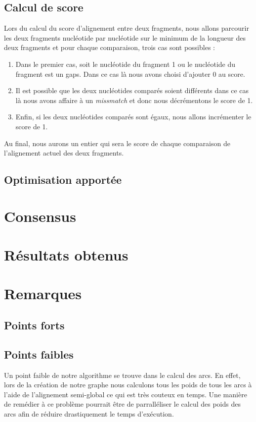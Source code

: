 \documentclass[a4paper, 12pt]{article}
\begin{document}
	\subsection{Calcul de score}
		Lors du calcul du score d'alignement entre deux fragments, nous allons parcourir les deux fragments nucléotide par nucléotide sur le minimum de la longueur des deux fragments et pour chaque comparaison, trois cas sont possibles : 
		\begin{enumerate}
			\item Dans le premier cas, soit le nucléotide du fragment 1 ou le nucléotide du fragment est un gaps. Dans ce cas là nous avons choisi d'ajouter 0 au score.
			\item Il est possible que les deux nucléotides comparés soient différents dans ce cas là nous avons affaire à un \textit{missmatch} et donc nous décrémentons le score de 1.
			\item Enfin, si les deux nucléotides comparés sont égaux, nous allons incrémenter le score de 1.
		\end{enumerate}
		Au final, nous aurons un entier qui sera le score de chaque comparaison de l'alignement actuel des deux fragments.
	\subsection{Optimisation apportée}
\section{Consensus}


\section{Résultats obtenus}
\section{Remarques}

	\subsection{Points forts}
	\subsection{Points faibles}

		Un point faible de notre algorithme se trouve dans le calcul des arcs. En effet, lors de la création de notre graphe nous calculons tous les poids de tous les arcs à l'aide de l'alignement semi-global ce qui est très couteux en temps. Une manière de remédier à ce problème pourrait être de parralléliser le calcul des poids des arcs afin de réduire drastiquement le temps d'exécution.\\
		
\end{document}
